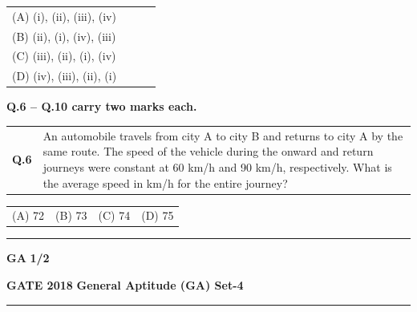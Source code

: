 \documentclass[journal,12pt,onecolumn]{IEEEtran}
\theoremstyle{remark}
\begin{document}
\hspace{1cm}


\vspace{0.3cm}

\begin{tabular}{llll}
\hspace{1cm} (A) (i), (ii), (iii), (iv) \\
\hspace{1cm} (B) (ii), (i), (iv), (iii) \\
\hspace{1cm} (C) (iii), (ii), (i), (iv) \\
\hspace{1cm} (D) (iv), (iii), (ii), (i) \\
\end{tabular}


\vspace*{1cm} %

 \hspace{0.2cm} \textbf{Q.6 -- Q.10 carry two marks each.}

\vspace{0.6cm}


\noindent
\begin{tabular} 
{@{}ll}
\hspace{0.7cm} \textbf{Q.6} & \parbox[t]{14cm}{
An automobile travels from city A to city B and returns to city A by the same route. The speed of the vehicle during the onward and return journeys were constant at 60 km/h and 90 km/h, respectively. What is the average speed in km/h for the entire journey?
}
\end{tabular}
\vspace{1cm}

\begin{tabular}{llll}

\hspace{1.5cm} (A) 72 &\hspace{2.5cm} (B) 73 & \hspace{2.5cm } (C) 74 &\hspace{2.5cm} (D) 75 \\ 

\end{tabular} 
\vspace{0.5cm}
\hrule 
\vspace{0.2cm}


\textbf{ GA } \hfill \textbf{1/2}



\noindent
\textbf{GATE 2018} \hfill \textbf{General Aptitude (GA) Set-4} \\
\rule{\textwidth}{0.4pt}
\end{document}
